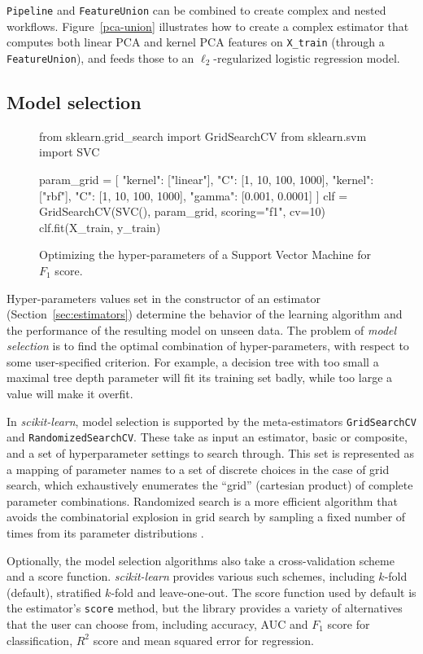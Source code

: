 \documentclass[twocolumn]{article}
\newcommand{\sklearn}{\textit{scikit-learn}\xspace}
\begin{document}
\texttt{Pipeline} and \texttt{FeatureUnion} can be
combined to create complex and nested workflows.
Figure~\ref{pca-union} illustrates how to create a complex estimator
that computes both linear PCA and kernel PCA features on \texttt{X\_train}
(through a \texttt{FeatureUnion}),
and feeds those to an $\ell_2$-regularized logistic regression model.

\subsection{Model selection}

\begin{figure*}[t]
\begin{pythoncode}
from sklearn.grid_search import GridSearchCV
from sklearn.svm import SVC

param_grid = [
  {"kernel": ["linear"], "C": [1, 10, 100, 1000]},
  {"kernel": ["rbf"], "C": [1, 10, 100, 1000],
   "gamma": [0.001, 0.0001]}
]
clf = GridSearchCV(SVC(), param_grid, scoring="f1", cv=10)
clf.fit(X_train, y_train)
\end{pythoncode}
\caption{Optimizing the hyper-parameters of a Support Vector Machine for $F_1$
score.}
\label{svm-gridsearch}
\end{figure*}

Hyper-parameters values set in the constructor of an estimator
(Section~\ref{sec:estimators})
determine the behavior of the learning algorithm
and the performance of the resulting model on unseen data.
The problem of \textit{model selection} is to find
the optimal combination of hyper-parameters, with
respect to some user-specified criterion. For example, a decision
tree with too small a maximal tree depth parameter will fit its training set badly,
while too large a value will make it overfit.

In \sklearn, model selection is supported by the meta-estimators
\texttt{GridSearchCV} and \texttt{RandomizedSearchCV}.  These take as input an
estimator, basic or composite,
and a set of hyperparameter settings to search through.
This set is represented as a mapping of parameter names
to a set of discrete choices in the case of grid search,
which exhaustively enumerates the ``grid'' (cartesian product)
of complete parameter combinations.
Randomized search is a more efficient algorithm
that avoids the combinatorial explosion in grid search
by sampling a fixed number of times from its parameter distributions
\citep{bergstra2012}.

Optionally, the model selection algorithms
also take a cross-validation scheme and a score function.  \sklearn provides
various such schemes, including $k$-fold (default),
stratified $k$-fold and leave-one-out.
The score function used by default is the estimator's \texttt{score} method,
but the library provides a variety of
alternatives that the user can choose from,
including accuracy, AUC and $F_1$ score for classification,
$R^2$ score and mean squared error for regression.
\end{document}
